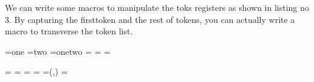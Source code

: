 
\def\MoveRest(#1to#2){#2=\RestOf{#1}}

We can write some macros to manipulate the toks registers as shown in listing no 3. By capturing the firsttoken and the rest of tokens, you can actually write a macro to transverse the token list.

\begin{minipage}[t]{4cm}
\begin{teX}
={one}                         
={two}                         
={{one}{two}}            
\ToksOne={}          
\ToksTwo=                   
\ToksThree=                
\end{teX}

\end{minipage}
\hspace{1.5cm}
\begin{minipage}[t]{4cm}
\begin{teX}
=
=
=
=\RestOf\ToksOne
{}=\Union(,)
\MoveRest(\toks9 to)
\end{teX}
\end{minipage}
\bigskip  

